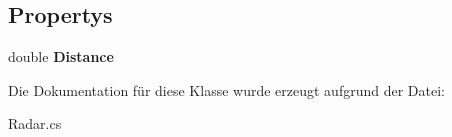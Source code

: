 \subsection*{Propertys}
\begin{DoxyCompactItemize}
\item 
\hypertarget{class_robot_ctrl_1_1_radar_a0339d462806cb7fc3759d850b5564dd9}{
double {\bfseries Distance}}
\label{class_robot_ctrl_1_1_radar_a0339d462806cb7fc3759d850b5564dd9}

\end{DoxyCompactItemize}


Die Dokumentation für diese Klasse wurde erzeugt aufgrund der Datei:\begin{DoxyCompactItemize}
\item 
Radar.cs\end{DoxyCompactItemize}
